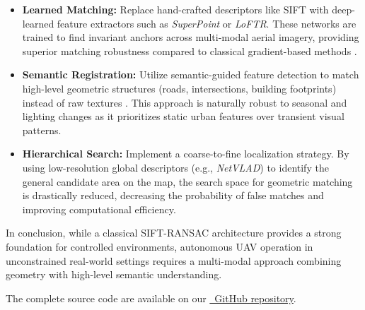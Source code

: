 \begin{itemize}
    \item \textbf{Learned Matching:} Replace hand-crafted descriptors like SIFT with deep-learned feature extractors such as \textit{SuperPoint} or \textit{LoFTR}. These networks are trained to find invariant anchors across multi-modal aerial imagery, providing superior matching robustness compared to classical gradient-based methods \cite{opencv_matching}.
    \item \textbf{Semantic Registration:} Utilize semantic-guided feature detection to match high-level geometric structures (roads, intersections, building footprints) instead of raw textures \cite{xue2023sfd2}. This approach is naturally robust to seasonal and lighting changes as it prioritizes static urban features over transient visual patterns.
    \item \textbf{Hierarchical Search:} Implement a coarse-to-fine localization strategy.
 By using low-resolution global descriptors (e.g., \textit{NetVLAD}) to identify the general candidate area on the map, the search space for geometric matching is drastically reduced, decreasing the probability of false matches and improving computational efficiency.
\end{itemize}

In conclusion, while a classical SIFT-RANSAC architecture provides a strong foundation for controlled environments, autonomous UAV operation in unconstrained real-world settings requires a multi-modal approach combining geometry with high-level semantic understanding.

The complete source code are available on our \href{https://github.com/BohdanZasymovych/uav-image-to-map-localization}{\faGithub\ GitHub repository}.
